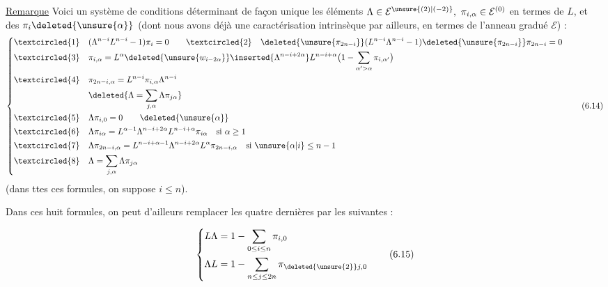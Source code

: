 \uline{Remarque} Voici un système de conditions déterminant de façon unique les éléments $\Lambda\in\mathcal E^{\unsure{(2)|(-2)}},\ \pi_{i,\alpha}\in\mathcal E^{(0)}$ en termes de $L$, et des $\pi_i\deleted{\unsure{\alpha}}$ (dont nous avons déjà une caractérisation intrinsèque par ailleurs, en termes de l'anneau gradué $\mathcal E$) :
\[
\left\{\begin{aligned}
\textcircled{1}\quad &(\Lambda^{n-i}L^{n-i}-1)\pi_i=0
\qquad\textcircled{2}\quad\deleted{\unsure{\pi_{2n-i}}}(L^{n-i}\Lambda^{n-i}-1)\deleted{\unsure{\pi_{2n-i}}}\pi_{2n-i}=0\\
\textcircled{3}\quad &\pi_{i,\alpha}=L^\alpha\deleted{\unsure{w_{i-2\alpha}}}\inserted{\Lambda^{n-i+2\alpha}}L^{n-i+\alpha}\bigl(1-\sum_{\alpha'>\alpha}\pi_{i,\alpha'}\bigr)\\
\textcircled{4}\quad &\pi_{2n-i,\alpha}=L^{n-i}\pi_{i,\alpha}\Lambda^{n-i}\\
&\deleted{\Lambda=\sum_{j,\alpha}\Lambda\pi_{j\alpha}}\\
\textcircled{5}\quad &\Lambda\pi_{i,0}=0\qquad\deleted{\unsure{\alpha}}\\
\textcircled{6}\quad &\Lambda\pi_{i\alpha}=L^{\alpha-1}\Lambda^{n-i+2\alpha}L^{n-i+\alpha}\pi_{i\alpha}\quad\text{si }\alpha\geq1\\
\textcircled{7}\quad &\Lambda\pi_{2n-i,\alpha}=L^{n-i+\alpha-1}\Lambda^{n-i+2\alpha}L^\alpha\pi_{2n-i,\alpha}\quad\text{si }\unsure{\alpha|i}\leq n-1\\
\textcircled{8}\quad &\Lambda=\sum_{j,\alpha}\Lambda\pi_{j\alpha}
\end{aligned}\right.
\tag{6.14}
\]
(dans ttes ces formules, on suppose $i\leq n$).

Dans ces huit formules, on peut d'ailleurs remplacer les quatre dernières par les suivantes  :

\[
\left\{\begin{aligned}
L\Lambda&=1-\sum_{0\leq i\leq n}\pi_{i,0}\\
\Lambda L&=1-\sum_{n\leq j\leq2n}\pi_{\deleted{\unsure{2}}j,0}
\end{aligned}\right.
\tag{6.15}
\]

